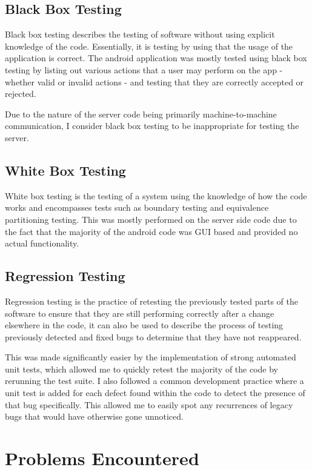 \subsection{Black Box Testing}
Black box testing describes the testing of software without using explicit knowledge of the code.
Essentially, it is testing by using that the usage of the application is correct.
The android application was mostly tested using black box testing by listing out various actions that a user may perform on the app - whether valid or invalid actions - and testing that they are correctly accepted or rejected.

Due to the nature of the server code being primarily machine-to-machine communication, I consider black box testing to be inappropriate for testing the server.

\subsection{White Box Testing}
White box testing is the testing of a system using the knowledge of how the code works and encompasses tests such as boundary testing and equivalence partitioning testing.
This was mostly performed on the server side code due to the fact that the majority of the android code was GUI based and provided no actual functionality.

\subsection{Regression Testing}
Regression testing is the practice of retesting the previously tested parts of the software to ensure that they are still performing correctly after a change elsewhere in the code, it can also be used to describe the process of testing previously detected and fixed bugs to determine that they have not reappeared.

This was made significantly easier by the implementation of strong automated unit tests, which allowed me to quickly retest the majority of the code by rerunning the test suite.
I also followed a common development practice where a unit test is added for each defect found within the code to detect the presence of that bug specifically. 
This allowed me to easily spot any recurrences of legacy bugs that would have otherwise gone unnoticed.

\section{Problems Encountered}
